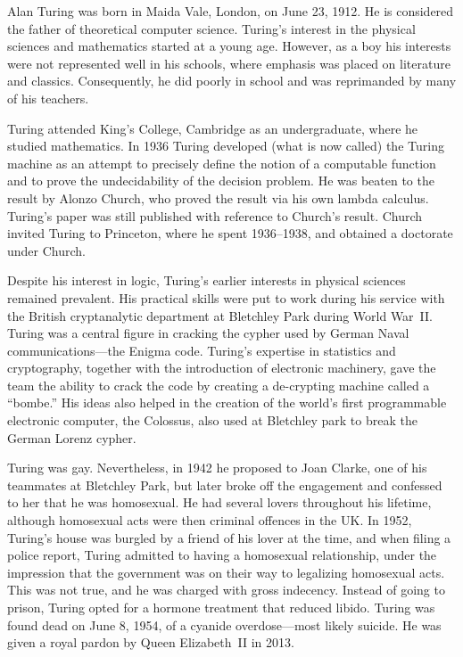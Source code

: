 \documentclass[../../../include/open-logic-section]{subfiles}
\begin{document}


Alan Turing was born in Maida Vale, London, on June 23, 1912. He is
considered the father of theoretical computer science. Turing's
interest in the physical sciences and mathematics started at a young
age. However, as a boy his interests were not represented well in his
schools, where emphasis was placed on literature and
classics. Consequently, he did poorly in school and was reprimanded by
many of his teachers.


Turing attended King's College, Cambridge as an undergraduate, where
he studied mathematics. In 1936 Turing developed (what is now called)
the Turing machine as an attempt to precisely define the notion of a
computable function and to prove the undecidability of the decision
problem. He was beaten to the result by Alonzo Church, who proved the
result via his own lambda calculus. Turing's paper was still published
with reference to Church's result. Church invited Turing to Princeton,
where he spent 1936--1938, and obtained a doctorate under Church.

Despite his interest in logic, Turing's earlier interests in physical
sciences remained prevalent. His practical skills were put to work
during his service with the British cryptanalytic department at
Bletchley Park during World War~II. Turing was a central figure in
cracking the cypher used by German Naval communications---the Enigma
code.  Turing's expertise in statistics and cryptography, together
with the introduction of electronic machinery, gave the team the
ability to crack the code by creating a de-crypting machine called a
``bombe.'' His ideas also helped in the creation of the world's first
programmable electronic computer, the Colossus, also used at Bletchley
park to break the German Lorenz cypher.

Turing was gay. Nevertheless, in 1942 he proposed to Joan Clarke, one
of his teammates at Bletchley Park, but later broke off the engagement
and confessed to her that he was homosexual. He had several lovers
throughout his lifetime, although homosexual acts were then criminal
offences in the UK. In 1952, Turing's house was burgled by a friend of
his lover at the time, and when filing a police report, Turing
admitted to having a homosexual relationship, under the impression
that the government was on their way to legalizing homosexual
acts. This was not true, and he was charged with gross
indecency. Instead of going to prison, Turing opted for a hormone
treatment that reduced libido.  Turing was found dead on June 8, 1954,
of a cyanide overdose---most likely suicide. He was given a royal
pardon by Queen Elizabeth~II in 2013.
\end{document}

